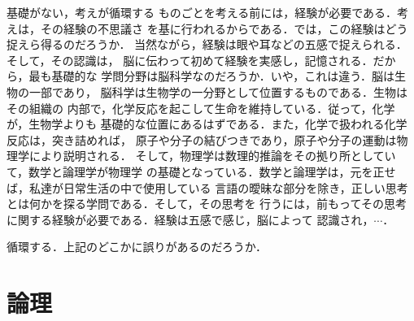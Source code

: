         \begin{memo}{基礎がない，考えが循環する}
            ものごとを考える前には，経験が必要である．考えは，その経験の不思議さ
            を基に行われるからである．では，この経験はどう捉えら得るのだろうか．
            当然ながら，経験は眼や耳などの五感で捉えられる．そして，その認識は，
            脳に伝わって初めて経験を実感し，記憶される．だから，最も基礎的な
            学問分野は脳科学なのだろうか．いや，これは違う．脳は生物の一部であり，
            脳科学は生物学の一分野として位置するものである．生物はその組織の
            内部で，化学反応を起こして生命を維持している．従って，化学が，生物学よりも
            基礎的な位置にあるはずである．また，化学で扱われる化学反応は，突き詰めれば，
            原子や分子の結びつきであり，原子や分子の運動は物理学により説明される．
            そして，物理学は数理的推論をその拠り所としていて，数学と論理学が物理学
            の基礎となっている．数学と論理学は，元を正せば，私達が日常生活の中で使用している
            言語の曖昧な部分を除き，正しい思考とは何かを探る学問である．そして，その思考を
            行うには，前もってその思考に関する経験が必要である．経験は五感で感じ，脳によって
            認識され，$\cdots$．

            循環する．上記のどこかに誤りがあるのだろうか．
        \end{memo}

\chapter{論理}
